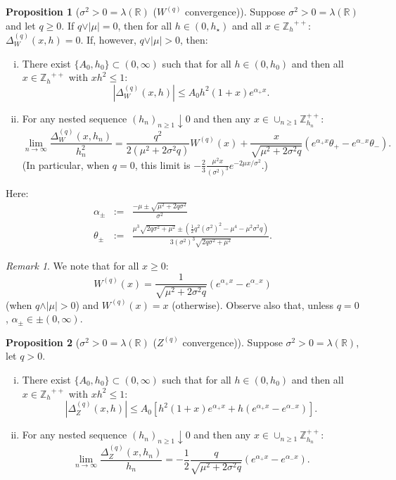 \documentclass[pdftex,oneside,11pt,reqno]{amsart}
\theoremstyle{definition}
\theoremstyle{theorem}
\newtheorem{proposition}{Proposition}[section]
\theoremstyle{remark}
\newtheorem{remark}{Remark}[section]
\numberwithin{equation}{section}
\numberwithin{definition}{section}
\begin{document}
\begin{proposition}[${\sigma^2}>0={\lambda}(\mathbb{R})$ (${W^{(q)}}$ convergence)]\label{proposition:convergence:BM+drift:Wq}
Suppose ${\sigma^2}>0={\lambda}(\mathbb{R})$ and let $q\geq 0$. If $q\lor \vert \mu\vert=0$, then for all $h\in (0,h_ \star)$ and all $x\in {\mathbb{Z}_h}^{++}$: ${\Delta_{W}^{(q)}(x,h)}=0$. If, however, $q\lor \vert \mu\vert>0$, then:
\begin{enumerate}[(i)]
\item There exist $\{A_0,h_0\}\subset (0,\infty)$ such that for all $h\in (0,h_0)$ and then all $x\in {\mathbb{Z}_h}^{++}$ with $xh^2\leq 1$: $$\left\vert{\Delta_{W}^{(q)}(x,h)}\right\vert\leq A_0h^2(1+x)e^{\alpha_+ x}.$$
\item For any nested sequence $(h_n)_{n\geq 1}\downarrow 0$ and then any $x\in \cup_{n\geq 1} \mathbb{Z}_{h_n}^{++}$: $$\lim_{n\to\infty}\frac{\Delta_{W}^{(q)}(x,h_n)}{h_n^2}=\frac{q^2}{2({\mu}^2+2{\sigma^2} q)}{W^{(q)}}(x)+\frac{x}{\sqrt{{\mu}^2+2{\sigma^2} q}}\left(e^{\alpha_+ x}\theta_+-e^{\alpha_- x}\theta_-\right).$$ (In particular, when $q=0$, this limit is $-\frac{2}{3}\frac{{\mu}^2 x}{({\sigma^2})^3}e^{-2 \mu x/{\sigma^2}}$.)
\end{enumerate}
Here:
\begin{eqnarray*}
\alpha_\pm&:=&\frac{-{\mu}\pm\sqrt{{\mu}^2+2 q{\sigma^2}}}{\sigma^2}\\
\theta_\pm&:=&\frac{{\mu}^3\sqrt{2q{\sigma^2}+ {\mu}^2}\pm(\frac{1}{2}q^2({\sigma^2})^2-{\mu}^4-{\mu}^2{\sigma^2} q)}{3({\sigma^2})^3\sqrt{2q{\sigma^2}+ {\mu}^2}}.
\end{eqnarray*}
\end{proposition}

\begin{remark}
We note that for all $x\geq 0$: $${W^{(q)}}(x)=\frac{1}{\sqrt{{\mu}^2+2{\sigma^2} q}}\left(e^{\alpha_+ x}-e^{\alpha_-x}\right)$$ (when $q\land \vert \mu\vert>0$) and ${W^{(q)}}(x)
=x$ (otherwise). Observe also that, unless $q=0$, $\alpha_\pm\in\pm (0,\infty)$. 
\end{remark}

\begin{proposition}[${\sigma^2}>0={\lambda}(\mathbb{R})$ (${Z^{(q)}}$ convergence)]\label{proposition:convergence:BM+drift:Zq}
Suppose ${\sigma^2}>0={\lambda}(\mathbb{R})$, let $q>0$. 
\begin{enumerate}[(i)]
\item There exist $\{A_0,h_0\}\subset (0,\infty)$ such that for all $h\in (0,h_0)$ and then all $x\in {\mathbb{Z}_h}^{++}$ with $xh^2\leq 1$: $$\left\vert {\Delta_{Z}^{(q)}(x,h)}\right\vert\leq A_0\left[h^2(1+x)e^{\alpha_+x}+h(e^{\alpha_+ x}-e^{\alpha_- x})\right].$$
\item For any nested sequence $(h_n)_{n\geq 1}\downarrow 0$ and then any $x\in \cup_{n\geq 1} \mathbb{Z}_{h_n}^{++}$: $$\lim_{n\to\infty}\frac{\Delta_{Z}^{(q)}(x,h_n)}{h_n}=-\frac{1}{2}\frac{q}{\sqrt{{\mu}^2+2{\sigma^2} q}}\left(e^{\alpha_+x}-e^{\alpha_-x}\right).$$
\end{enumerate}
\end{proposition}
\end{document}
